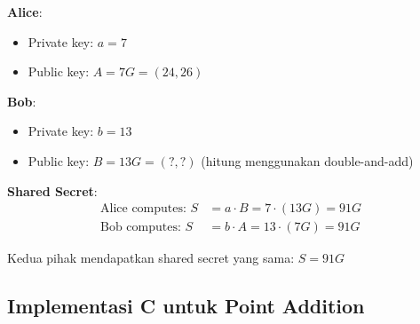 \textbf{Alice}:
\begin{itemize}
  \item Private key: $a = 7$
  \item Public key: $A = 7G = (24, 26)$
\end{itemize}

\textbf{Bob}:
\begin{itemize}
  \item Private key: $b = 13$
  \item Public key: $B = 13G = (?, ?)$ (hitung menggunakan double-and-add)
\end{itemize}

\textbf{Shared Secret}:
\begin{align*}
\text{Alice computes: } S &= a \cdot B = 7 \cdot (13G) = 91G \\
\text{Bob computes: } S &= b \cdot A = 13 \cdot (7G) = 91G
\end{align*}

Kedua pihak mendapatkan shared secret yang sama: $S = 91G$

\subsection{Implementasi C untuk Point Addition}

